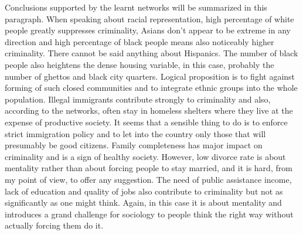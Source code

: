 \documentclass[english,cover]{fitthesis} %
\begin{document}
Conclusions supported by the learnt networks will be summarized in this paragraph.
When speaking about racial representation, high percentage of white people greatly suppresses criminality, Asians don't appear to be extreme in any direction and high percentage of black people means also noticeably higher criminality. There cannot be said anything about Hispanics. The number of black people also heightens the dense housing variable, in this case, probably the number of ghettos and black city quarters. Logical proposition is to fight against forming of such closed communities and to integrate ethnic groups into the whole population.
Illegal immigrants contribute strongly to criminality and also, according to the networks, often stay in homeless shelters where they live at the expense of productive society. It seems that a sensible thing to do is to enforce strict immigration policy and to let into the country only those that will presumably be good citizens.
Family completeness has major impact on criminality and is a sign of healthy society. However, low divorce rate is about mentality rather than about forcing people to stay married, and it is hard, from my point of view, to offer any suggestion.
The need of public assistance income, lack of education and quality of jobs also contribute to criminality but not as significantly as one might think. Again, in this case it is about mentality and introduces a grand challenge for sociology to  people think the right way without actually forcing them do it.


\clearpage
\end{document}

